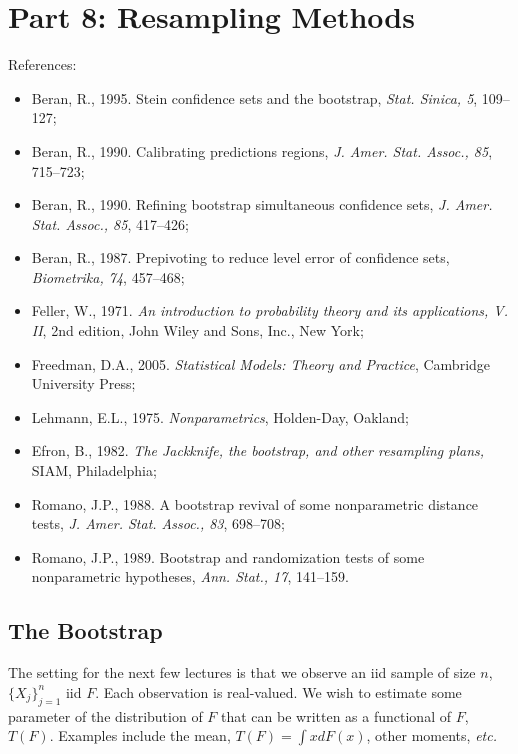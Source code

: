 \date{Revised 23 April 2008}


\begin{center}

\end{center}
\section{Part 8: Resampling Methods}
References:
\begin{itemize}
        \item Beran, R., 1995. Stein confidence sets and the bootstrap,
                {\em Stat. Sinica, 5}, 109--127;
        \item Beran, R., 1990. Calibrating predictions regions,
                {\em J. Amer. Stat. Assoc., 85}, 715--723;
        \item Beran, R., 1990. Refining bootstrap simultaneous confidence sets,
                {\em J. Amer. Stat. Assoc., 85}, 417--426;
        \item Beran, R., 1987. Prepivoting to reduce level error of confidence sets,
                {\em Biometrika, 74}, 457--468;
        \item Feller, W., 1971. {\em An introduction to probability theory and its applications,
                V. II}\/, 2nd edition, John Wiley and Sons, Inc., New York;
        \item Freedman, D.A., 2005. {\em Statistical Models: Theory and Practice\/},
                Cambridge University Press;
        \item Lehmann, E.L., 1975. {\em Nonparametrics}\/, Holden-Day, Oakland;
        \item Efron, B., 1982. {\em The Jackknife, the bootstrap, and other resampling plans,} SIAM,
                Philadelphia;
        \item Romano, J.P., 1988. A bootstrap revival of some nonparametric distance tests,
                {\em J. Amer. Stat. Assoc., 83}, 698--708;
        \item Romano, J.P., 1989. Bootstrap and randomization tests of some nonparametric hypotheses,
                {\em Ann. Stat., 17}, 141--159.
\end{itemize}

\subsection{The Bootstrap}
The setting for the next few lectures is that we observe an iid sample
of size $n$,
$\{X_j \}_{j=1}^n$ iid $F$.
Each observation is real-valued.
We wish to estimate some parameter of the distribution of
$F$ that can be written as a functional of $F$, $T(F)$.
Examples include the mean, $T(F) = \int x dF(x)$, other moments,
{\em etc.}

